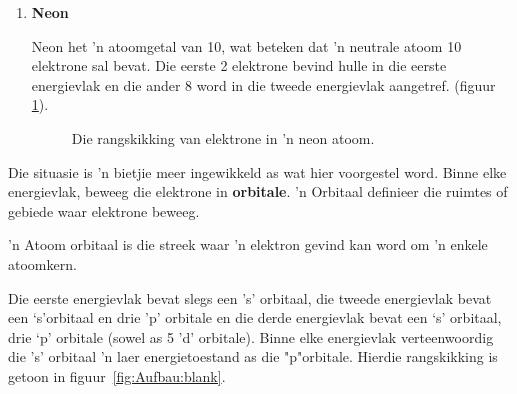 \begin{enumerate}[noitemsep, label=\textbf{\arabic*}. ]
\item{\textbf{Neon} \\
\begin{minipage}{.4\textwidth}
Neon het 'n atoomgetal van 10, wat beteken dat 'n neutrale atoom 10 elektrone sal bevat. Die eerste 2 elektrone bevind hulle in die eerste energievlak en die ander 8 word in die tweede energievlak aangetref. (figuur \ref{fig:atom:argon}).
\end{minipage}
\begin{minipage}{.6\textwidth}
\begin{figure}[H]
\begin{center}
\caption{Die rangskikking van elektrone in 'n neon atoom.}
\label{fig:atom:argon}
\end{center}
\end{figure}
\end{minipage}
}
\end{enumerate}


\label{m38741*id259478}Die situasie is 'n bietjie meer ingewikkeld as wat hier voorgestel word. Binne elke energievlak, beweeg die elektrone in \textbf{orbitale}. 'n Orbitaal definieer die ruimtes of gebiede waar elektrone beweeg.\par 

 {'n Atoom orbitaal is die streek waar 'n elektron gevind kan word om 'n enkele atoomkern.} 

\label{m38741*id6732}
Die eerste energievlak bevat slegs een 's' orbitaal, die tweede energievlak bevat een ‘s’orbitaal en drie 'p' orbitale en die derde energievlak bevat een ‘s’ orbitaal, drie ‘p’ orbitale (sowel as 5 'd' orbitale). Binne elke energievlak verteenwoordig die 's' orbitaal 'n laer energietoestand as die "p"orbitale. Hierdie rangskikking is getoon in figuur~\ref{fig:Aufbau:blank}. 


